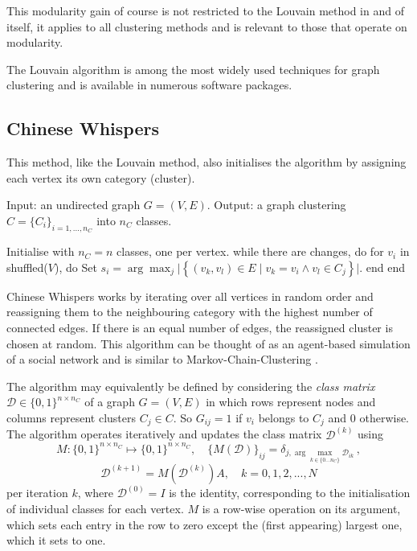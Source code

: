 \documentclass[12pt, a4paper]{article}
\begin{document}
  This modularity gain of course is not restricted to the Louvain method in and of itself, it applies to all clustering methods and is relevant to those that operate on modularity.

  The Louvain algorithm is among the most widely used techniques for graph clustering and is available in numerous software packages.

  \subsection{Chinese Whispers}
  \label{sec:cw}
  This method, like the Louvain method, also initialises the algorithm by assigning each vertex its own category (cluster).

  \begin{algorithm}[language=pseudo, caption={\centering The \textit{Chinese Whispers} algorithm due to \cite{cw-biemann}}]
Input: an undirected graph $G = (V, E)$.
Output: a graph clustering $C = \{C_i\}_{i=1, ..., n_C}$ into $n_C$ classes.

Initialise with $n_C = n$ classes, one per vertex.
while there are changes, do
  for $v_i$ in shuffled($V$), do
    Set $s_i = \arg\max_{j} \big|\left\{(v_k, v_l) \in E \;|\; v_k = v_i \wedge v_l \in C_j\right\}\big|$.
  end
end
  \end{algorithm}

  Chinese Whispers works by iterating over all vertices in random order and reassigning them to the neighbouring category with the highest number of connected edges. If there is an equal number of edges, the reassigned cluster is chosen at random.
  This algorithm can be thought of as an agent-based simulation of a social network \parencite{cw-biemann} and is similar to Markov-Chain-Clustering \parencite{van-dongen, fortunato}.

  The algorithm may equivalently be defined by considering the \textit{class matrix} $\mathcal{D} \in \{0, 1\}^{n \times n_C}$ of a graph $G = (V, E)$ in which rows represent nodes and columns represent clusters $C_j \in C$.
  So $G_{ij} = 1$ if $v_i$ belongs to $C_j$ and $0$ otherwise.
  The algorithm operates iteratively and updates the class matrix $\mathcal{D}^{(k)}$ using
  $$M: \{0, 1\}^{n \times n_C} \mapsto \{0, 1\}^{n \times n_C}, \quad \{M(\mathcal{D})\}_{ij} = \delta_{j,\arg\max_{k\in \{0...n_C\}} \mathcal{D}_{ik}}\,,$$
  $$\mathcal{D}^{(k+1)} = M(\mathcal{D}^{(k)}) A, \quad k = 0, 1, 2, ..., N$$
  per iteration $k$, where $\mathcal{D}^{(0)} = I$ is the identity, corresponding to the initialisation of individual classes for each vertex.
  $M$ is a row-wise operation on its argument, which sets each entry in the row to zero except the (first appearing) largest one, which it sets to one.
\end{document}
